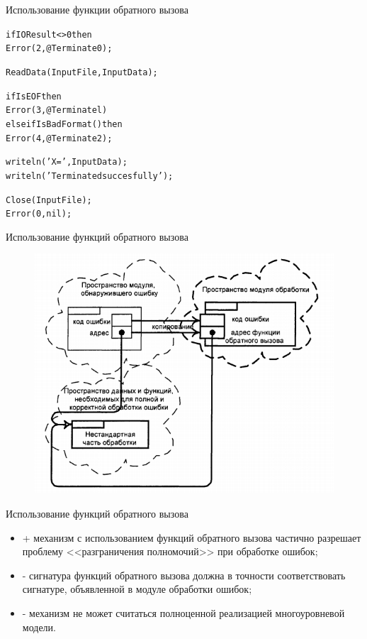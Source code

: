 \documentclass{beamer}
\begin{document}
\begin{frame}[fragile]{Использование функции обратного вызова}
\begin{alltt}
  if IOResult <> 0 then
    Error(2, @Terminate0);

  ReadData(InputFile, InputData);

  if IsEOF then
    Error(3, @Terminatel)
  else if IsBadFormat() then
    Error(4, @Terminate2);
    
  writeln('X = ', InputData);
  writeln('Terminated succesfully');

  Close(InputFile);
  Error(0, nil);    
\end{alltt}
\end{frame}

\begin{frame}{Использование функций обратного вызова}
\begin{figure}[h]
\centering
\includegraphics[scale=0.6]{images/lec08-pic05.png}
\end{figure}
\end{frame}

\begin{frame}{Использование функций обратного вызова}
\begin{itemize}
\item + механизм с использованием функций обратного вызова частично разрешает проблему <<разграничения полномочий>> при обработке ошибок;
\item - сигнатура функций обратного вызова должна в точности соответствовать сигнатуре, объявленной в модуле обработки ошибок;
\item - механизм не может считаться полноценной реализацией многоуровневой модели.
\end{itemize}
\end{frame}
\end{document}
